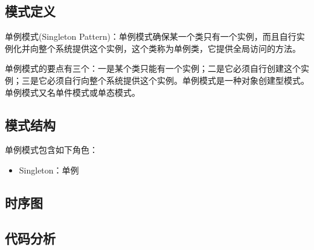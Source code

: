 \documentclass[letterpaper,10pt,english]{sphinxmanual}
\begin{document}
\subsection{模式定义}
\label{\detokenize{creational_patterns/singleton:id4}}
\sphinxAtStartPar
单例模式(Singleton Pattern)：单例模式确保某一个类只有一个实例，而且自行实例化并向整个系统提供这个实例，这个类称为单例类，它提供全局访问的方法。

\sphinxAtStartPar
单例模式的要点有三个：一是某个类只能有一个实例；二是它必须自行创建这个实例；三是它必须自行向整个系统提供这个实例。单例模式是一种对象创建型模式。单例模式又名单件模式或单态模式。


\subsection{模式结构}
\label{\detokenize{creational_patterns/singleton:id5}}
\sphinxAtStartPar
单例模式包含如下角色：
\begin{itemize}
\item {} 
\sphinxAtStartPar
Singleton：单例

\end{itemize}

\noindent{}


\subsection{时序图}
\label{\detokenize{creational_patterns/singleton:id6}}
\noindent{}


\subsection{代码分析}
\label{\detokenize{creational_patterns/singleton:id7}}
%
\begin{sphinxVerbatim}[commandchars=\\\{\},numbers=left,firstnumber=1,stepnumber=1]

\PYG{p}{[}\PYG{p}{]}
\end{sphinxVerbatim}
\sphinxresetverbatimhllines
\end{document}
